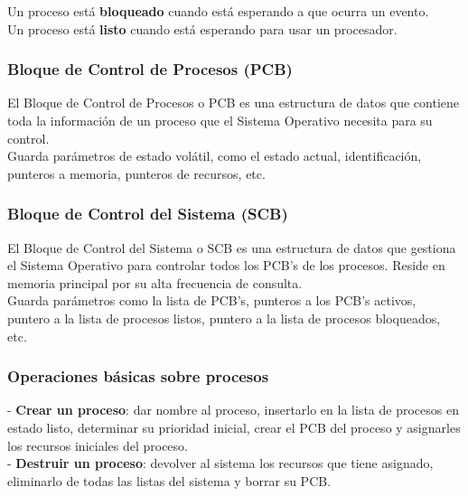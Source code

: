 \documentclass[spanish, 12pt]{article}
\begin{document}
			Un proceso está \textbf{bloqueado} cuando está esperando a que ocurra un evento.\\
			
			Un proceso está \textbf{listo} cuando está esperando para usar un procesador.\\
			
			\newpage
			
			\subsubsection{Bloque de Control de Procesos (PCB)}
			
				El Bloque de Control de Procesos o PCB es una estructura de datos que contiene toda la información de un proceso que el Sistema Operativo necesita para su control.\\
			
			Guarda 	parámetros de estado volátil, como el estado actual, identificación, punteros a memoria, punteros de recursos, etc.\\
			
		\subsubsection{Bloque de Control del Sistema (SCB)}
		
			El Bloque de Control del Sistema o SCB es una estructura de datos que gestiona el Sistema Operativo para controlar todos los PCB's de los procesos. Reside en memoria principal por su alta frecuencia de consulta.\\
			
			Guarda parámetros como la lista de PCB's, punteros a los PCB's activos, puntero a la lista de procesos listos, puntero a la lista de procesos bloqueados, etc.
		\subsubsection{Operaciones básicas sobre procesos}
		
			- \textbf{Crear un proceso}: dar nombre al proceso, insertarlo en la lista de procesos en estado listo, determinar su prioridad inicial, crear el PCB del proceso y asignarles los recursos iniciales del proceso.\\
			
			- \textbf{Destruir un proceso}: devolver al sistema los recursos que tiene asignado, eliminarlo de todas las listas del sistema y borrar su PCB.\\
			
\end{document}
